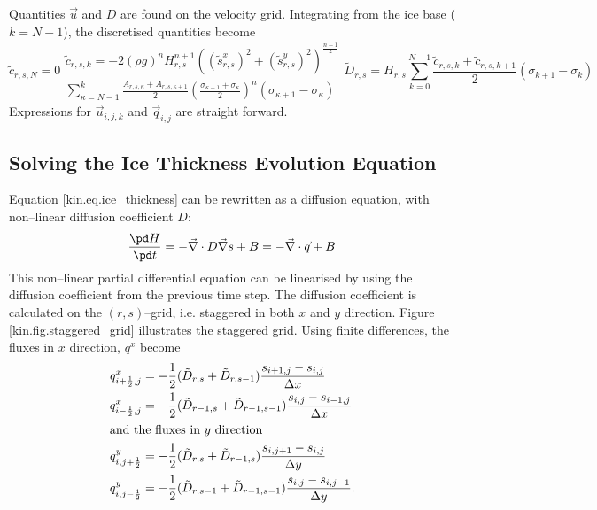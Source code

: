 Quantities $\vec u$ and $D$ are found on the velocity grid. Integrating from the ice base ($k=N-1$), the discretised quantities become
\begin{subequations}
  \begin{equation}
    \tilde{c}_{r,s,N}=0
  \end{equation}
  \begin{multline}
    \tilde{c}_{r,s,k}=-2(\rho g)^nH_{r,s}^{n+1}\left(({\tilde{s}^x_{r,s}})^2+({\tilde{s}^y_{r,s}})^2\right)^{\frac{n-1}{2}}\\
    \sum_{\kappa=N-1}^k\frac{A_{r,s,\kappa}+A_{r,s,\kappa+1}}2 \left(\frac{\sigma_{\kappa+1}+\sigma_\kappa}2\right)^n(\sigma_{\kappa+1}-\sigma_\kappa)
  \end{multline}
  \begin{equation}
    \tilde{D}_{r,s}=H_{r,s}\sum_{k=0}^{N-1}\frac{\tilde{c}_{r,s,k}+\tilde{c}_{r,s,k+1}}2(\sigma_{k+1}-\sigma_k)
  \end{equation}
\end{subequations}
Expressions for $\vec{u}_{i,j,k}$ and $\vec{q}_{i,j}$ are straight forward.

\subsection{Solving the Ice Thickness Evolution Equation}
Equation \eqref{kin.eq.ice_thickness} can be rewritten as a diffusion equation, with non--linear diffusion coefficient $D$:
\begin{equation}
  \label{kin.eq.ice_evo}
  \frac{\pd H}{\pd t}=-\vec\nabla\cdot D\vec\nabla s+B=-\vec\nabla\cdot\vec q+B
\end{equation}
This non--linear partial differential equation can be linearised by using the diffusion coefficient from the previous time step. The diffusion coefficient is calculated on the $(r,s)$--grid, i.e. staggered in both $x$ and $y$ direction. Figure \ref{kin.fig.staggered_grid} illustrates the staggered grid. Using finite differences, the fluxes in $x$ direction, $q^x$ become
\begin{subequations}
\begin{align}
  q^x_{i+\frac12,j}&=-\frac12(\tilde{D}_{r,s}+\tilde{D}_{r,s-1})\frac{s_{i+1,j}-s_{i,j}}{\Delta x}\\
  q^x_{i-\frac12,j}&=-\frac12(\tilde{D}_{r-1,s}+\tilde{D}_{r-1,s-1})\frac{s_{i,j}-s_{i-1,j}}{\Delta x}\\
  \intertext{and the fluxes in $y$ direction}
  q^y_{i,j+\frac12}&=-\frac12(\tilde{D}_{r,s}+\tilde{D}_{r-1,s})\frac{s_{i,j+1}-s_{i,j}}{\Delta y}\\
  q^y_{i,j-\frac12}&=-\frac12(\tilde{D}_{r,s-1}+\tilde{D}_{r-1,s-1})\frac{s_{i,j}-s_{i,j-1}}{\Delta y}.
\end{align}  
\end{subequations}

